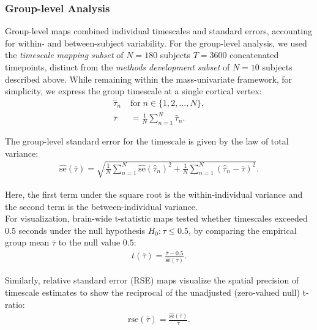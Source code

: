 \documentclass[9pt]{article}
\begin{document}
\subsubsection{Group-level Analysis}\label{sec:group-level-analysis}
Group-level maps combined individual timescales and standard errors, accounting for within- and between-subject variability. For the group-level analysis, we used the \textit{timescale mapping subset} of $N=180$ subjects $T=3600$ concatenated timepoints, distinct from the \textit{methods development subset} of $N=10$ subjects described above. While remaining within the mass-univariate framework, for simplicity, we express the group timescale at a single cortical vertex:
\begin{align}
    \hat\tau_n \; &\text{for} \; n\in\{1, 2, ..., N\},\\
    \bar\tau &= \frac{1}{N} \sum_{n=1}^N \hat\tau_n.
\end{align}

\noindent The group-level standard error for the timescale is given by the law of total variance:
\begin{align}
    \widehat{\text{se}}(\bar\tau) = \sqrt{\frac{1}{N} \sum_{n=1}^N \widehat{\text{se}}(\hat\tau_n)^2 + \frac{1}{N} \sum_{n=1}^N (\hat\tau_n - \bar\tau)^2}.
\end{align}

\noindent Here, the first term under the square root is the within-individual variance and the second term is the between-individual variance.\\

For visualization, brain-wide t-statistic maps tested whether timescales exceeded 0.5 seconds under the null hypothesis $H_0: \tau \leq 0.5$, by comparing the empirical group mean $\bar\tau$ to the null value $0.5$:
\begin{align}\label{eq:t-ratio}
    t(\bar\tau) = \frac{\bar\tau-0.5}{\widehat{\text{se}}(\bar\tau)}.
\end{align}

\noindent Similarly, relative standard error (RSE) maps visualize the spatial precision of timescale estimates to show the reciprocal of the unadjusted (zero-valued null) t-ratio:
\begin{align}
    \text{rse}(\bar\tau) = \frac{\widehat{\text{se}}(\bar\tau)}{\bar\tau}.
\end{align}
\end{document}
